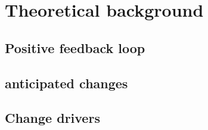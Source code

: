 \chapter{Theoretical background} \label{theoreticalbackground} 

\section{Positive feedback loop}
\lipsum[1-1]

\section{anticipated changes}
\lipsum[1-1]

\section{Change drivers}
\lipsum[1-1]



